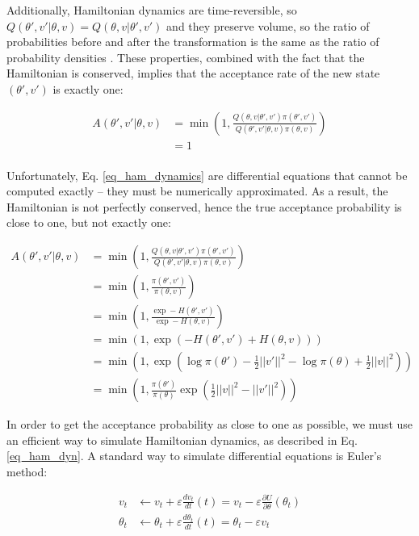 \documentclass[12pt]{article}
\begin{document}
Additionally, Hamiltonian dynamics are time-reversible, so $Q(\theta',v'|\theta,v) = Q(\theta,v|\theta',v')$ and they preserve volume, so the ratio of probabilities before and after the transformation is the same as the ratio of probability densities . These properties, combined with the fact that the Hamiltonian is conserved, implies that the acceptance rate of the new state $(\theta', v')$ is exactly one:

\begin{align}
A(\theta',v'|\theta,v) &= \min \left(1, \frac{Q(\theta,v|\theta',v')\pi(\theta',v')}{Q(\theta',v'|\theta,v)\pi(\theta,v)} \right) \\
&= 1 \\
\end{align}

Unfortunately, Eq. \ref{eq_ham_dynamics} are differential equations that cannot be computed exactly -- they must be numerically approximated. As a result, the Hamiltonian is not perfectly conserved, hence the true acceptance probability is close to one, but not exactly one:

\begin{align}
A(\theta',v'|\theta,v) &= \min \left(1, \frac{Q(\theta,v|\theta',v')\pi(\theta',v')}{Q(\theta',v'|\theta,v)\pi(\theta,v)} \right) \\
&= \min \left(1, \frac{\pi(\theta',v')}{\pi(\theta,v)} \right) \\
&= \min \left(1, \frac{\exp -H(\theta',v')}{\exp -H(\theta,v)} \right) \\
&= \min \left(1, \exp \left(-H(\theta', v') + H(\theta, v) \right) \right) \\
&= \min \left(1, \exp \left(\log \pi(\theta') - \frac{1}{2}||v'||^2 -\log \pi(\theta) + \frac{1}{2}||v||^2 \right) \right) \\
&= \min \left(1, \frac{\pi(\theta')}{\pi(\theta)} \exp \left( \frac{1}{2}||v||^2 - ||v'||^2 \right) \right)
\end{align}
\label{eq_hmc_accept_prob}

In order to get the acceptance probability as close to one as possible, we must use an efficient way to simulate Hamiltonian dynamics, as described in Eq. \ref{eq_ham_dyn}. A standard way to simulate differential equations is Euler’s method:

\begin{align}
v_t &\leftarrow v_t + \varepsilon \frac{dv_t}{dt}(t) = v_t - \varepsilon \frac{\partial U}{\partial \theta}(\theta_t) \\
\theta_t &\leftarrow \theta_t + \varepsilon \frac{d\theta_t}{dt}(t) = \theta_t - \varepsilon v_t
\end{align}
\end{document}
